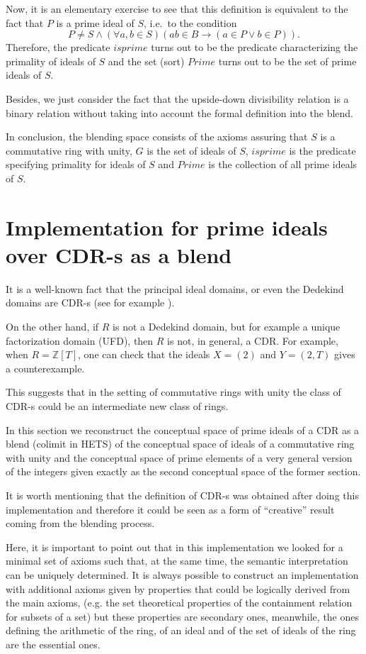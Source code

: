 Now, it is an elementary exercise to see that this definition is
equivalent to the fact that $P$ is a prime ideal of $S$, i.e.\ to the
condition
%
\[ P\neq S \wedge (\forall a,b\in S)(ab\in B\rightarrow (a\in P \vee
b\in P)).\] Therefore, the predicate $isprime$ turns out to be the
predicate characterizing the primality of ideals of $S$ and the set
(sort) $Prime$ turns out to be the set of prime ideals of $S$.

Besides, we just consider the fact that the upside-down divisibility
relation is a binary relation without taking into account the formal
definition into the blend.


In conclusion, the blending space consists of the axioms assuring that
$S$ is a commutative ring with unity, $G$ is the set of ideals of $S$,
$isprime$ is the predicate specifying primality for ideals of $S$ and
$Prime$ is the collection of all prime ideals of $S$.


\section{Implementation for prime ideals over CDR-s as a blend}\label{implementation}


It is a well-known fact that the principal ideal domains, or even the
Dedekind domains are CDR-s (see for example \cite[Fundamental Theorem
of AOK-s]{weissalgebraicnumber}).

On the other hand, if $R$ is not a Dedekind domain, but for example a
unique factorization domain (UFD), then $R$ is not, in general, a
CDR. For example, when $R=\mathbb{Z}[T]$, one can check that the
ideals $X=(2)$ and $Y=(2,T)$ gives a counterexample.

This suggests that in the setting of commutative rings with unity the
class of CDR-s could be an intermediate new class of rings.

In this section we reconstruct the conceptual space of prime ideals of
a CDR as a blend (colimit in HETS) of the conceptual space of ideals
of a commutative ring with unity and the conceptual space of prime
elements of a very general version of the integers given exactly as
the second conceptual space of the former section.

It is worth mentioning that the definition of CDR-s was obtained after
doing this implementation and therefore it could be seen as a form of
``creative'' result coming from the blending process.

Here, it is important to point out that in this implementation we
looked for a minimal set of axioms such that, at the same time, the
semantic interpretation can be uniquely determined. It is always
possible to construct an implementation with additional axioms given
by properties that could be logically derived from the main axioms,
(e.g. the set theoretical properties of the containment relation for
subsets of a set) but these properties are secondary ones, meanwhile,
the ones defining the arithmetic of the ring, of an ideal and of the
set of ideals of the ring are the essential ones.


